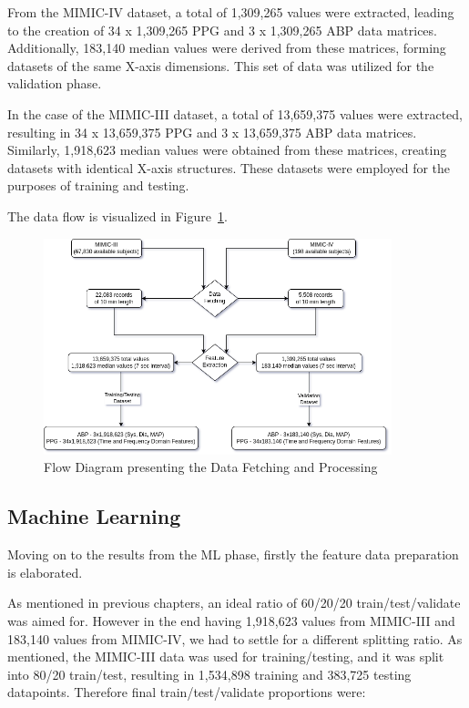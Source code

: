 From the MIMIC-IV dataset, a total of 1,309,265 values were extracted, leading to the creation of 34 x 1,309,265 PPG and 3 x 1,309,265 ABP data matrices.
Additionally, 183,140 median values were derived from these matrices, forming datasets of the same X-axis dimensions.
This set of data was utilized for the validation phase.

In the case of the MIMIC-III dataset, a total of 13,659,375 values were extracted, resulting in 34 x 13,659,375 PPG and 3 x 13,659,375 ABP data matrices.
Similarly, 1,918,623 median values were obtained from these matrices, creating datasets with identical X-axis structures.
These datasets were employed for the purposes of training and testing.

The data flow is visualized in Figure~\ref{fig:data_flow}.

\begin{figure}[h]
    \centering
    \includegraphics[width=0.9\textwidth]{images/results/flow_diagram}
    \caption{Flow Diagram presenting the Data Fetching and Processing}
    \label{fig:data_flow}
\end{figure}

\subsection{Machine Learning}
\label{subsec:machine_learning}

Moving on to the results from the ML phase, firstly the feature data preparation is elaborated.

As mentioned in previous chapters, an ideal ratio of 60/20/20 train/test/validate was aimed for.
However in the end having 1,918,623 values from MIMIC-III and 183,140 values from MIMIC-IV, we had to settle for a different splitting ratio.
As mentioned, the MIMIC-III data was used for training/testing, and it was split into 80/20 train/test, resulting in 1,534,898 training and 383,725 testing datapoints.
Therefore final train/test/validate proportions were:

